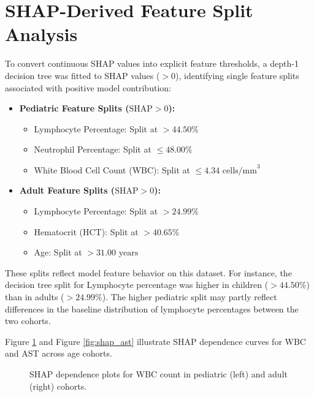 \documentclass[12pt, a4paper]{report}
\begin{document}
\section{SHAP-Derived Feature Split Analysis}
To convert continuous SHAP values into explicit feature thresholds, a depth-1 decision tree was fitted to SHAP values ($> 0$), identifying single feature splits associated with positive model contribution:
\begin{itemize}
    \item \textbf{Pediatric Feature Splits ($\text{SHAP} > 0$):}
    \begin{itemize}
        \item Lymphocyte Percentage: Split at \textbf{$> 44.50\%$}
        \item Neutrophil Percentage: Split at \textbf{$\le 48.00\%$}
        \item White Blood Cell Count (WBC): Split at \textbf{$\le 4.34 \text{ cells/mm}^3$}
    \end{itemize}
    \item \textbf{Adult Feature Splits ($\text{SHAP} > 0$):}
    \begin{itemize}
        \item Lymphocyte Percentage: Split at \textbf{$> 24.99\%$}
        \item Hematocrit (HCT): Split at \textbf{$> 40.65\%$}
        \item Age: Split at \textbf{$> 31.00 \text{ years}$}
    \end{itemize}
\end{itemize}

These splits reflect model feature behavior on this dataset. For instance, the decision tree split for Lymphocyte percentage was higher in children ($> 44.50\%$) than in adults ($> 24.99\%$). The higher pediatric split may partly reflect differences in the baseline distribution of lymphocyte percentages between the two cohorts.

Figure \ref{fig:shap_wbc} and Figure \ref{fig:shap_ast} illustrate SHAP dependence curves for WBC and AST across age cohorts.

\begin{figure}[htbp]
    \centering
    \caption{SHAP dependence plots for WBC count in pediatric (left) and adult (right) cohorts.}
    \label{fig:shap_wbc}
\end{figure}
\end{document}
